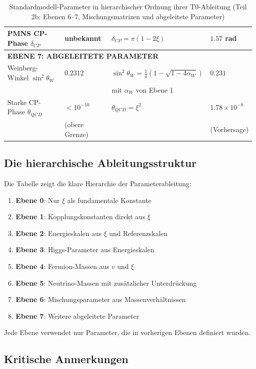 \documentclass[12pt,a4paper]{article}
\begin{document}
\begin{table}[htbp]
{\begin{tabular}{p{5cm}p{3cm}p{2.7cm}p{2.7cm}}
			PMNS CP-Phase $\delta_{CP}$ & unbekannt & $\delta_{CP} = \pi(1 - 2\xi)$ & $1.57$ rad \\
			\midrule
			\multicolumn{4}{l}{\textbf{EBENE 7: ABGELEITETE PARAMETER}} \\
			\midrule
			Weinberg-Winkel $\sin^2\theta_W$ & $0.2312$ & $\sin^2\theta_W = \frac{1}{4}(1-\sqrt{1-4\alpha_W})$ & $0.231$ \\
			& & mit $\alpha_W$ von Ebene 1 & \\[0.3em]
			Starke CP-Phase $\theta_{QCD}$ & $< 10^{-10}$ & $\theta_{QCD} = \xi^{2}$ & $1.78 \times 10^{-8}$ \\
			& (obere Grenze) & & (Vorhersage) \\
			\bottomrule
		\end{tabular}%
	}
	\caption{Standardmodell-Parameter in hierarchischer Ordnung ihrer T0-Ableitung (Teil 2b: Ebenen 6--7, Mischungsmatrizen und abgeleitete Parameter)}
	\label{tab:sm-params-2b}
\end{table}

\subsection{Die hierarchische Ableitungsstruktur}
\label{subsec:hierarchical_structure}

Die Tabelle zeigt die klare Hierarchie der Parameterableitung:

\begin{enumerate}
	\item \textbf{Ebene 0}: Nur $\xi$ als fundamentale Konstante
	\item \textbf{Ebene 1}: Kopplungskonstanten direkt aus $\xi$
	\item \textbf{Ebene 2}: Energieskalen aus $\xi$ und Referenzskalen
	\item \textbf{Ebene 3}: Higgs-Parameter aus Energieskalen
	\item \textbf{Ebene 4}: Fermion-Massen aus $v$ und $\xi$
	\item \textbf{Ebene 5}: Neutrino-Massen mit zusätzlicher Unterdrückung
	\item \textbf{Ebene 6}: Mischungsparameter aus Massenverhältnissen
	\item \textbf{Ebene 7}: Weitere abgeleitete Parameter
\end{enumerate}

Jede Ebene verwendet nur Parameter, die in vorherigen Ebenen definiert wurden.

\subsection{Kritische Anmerkungen}
\label{subsec:critical_notes}
\end{document}
